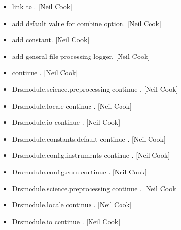 \documentclass[a4paper,10pt,english]{report}
\begin{document}
\begin{itemize}
\item {} 
 \sphinxhyphen{} link to . {[}Neil
Cook{]}

\item {} 
 \sphinxhyphen{} add default value for
combine option. {[}Neil Cook{]}

\item {} 
 \sphinxhyphen{} add  constant.
{[}Neil Cook{]}

\item {} 
 \sphinxhyphen{} add general file processing logger. {[}Neil Cook{]}

\item {} 
 \sphinxhyphen{} continue . {[}Neil
Cook{]}

\item {} 
Drsmodule.science.preprocessing \sphinxhyphen{} continue . {[}Neil Cook{]}

\item {} 
Drsmodule.locale \sphinxhyphen{} continue . {[}Neil Cook{]}

\item {} 
Drsmodule.io \sphinxhyphen{} continue . {[}Neil Cook{]}

\item {} 
Drsmodule.constants.default \sphinxhyphen{} continue . {[}Neil Cook{]}

\item {} 
Drsmodule.config.instruments \sphinxhyphen{} continue . {[}Neil Cook{]}

\item {} 
Drsmodule.config.core \sphinxhyphen{} continue . {[}Neil Cook{]}

\item {} 
Drsmodule.science.preprocessing \sphinxhyphen{} continue . {[}Neil Cook{]}

\item {} 
Drsmodule.locale \sphinxhyphen{} continue . {[}Neil Cook{]}

\item {} 
Drsmodule.io \sphinxhyphen{} continue . {[}Neil Cook{]}


\end{itemize}
\end{document}
